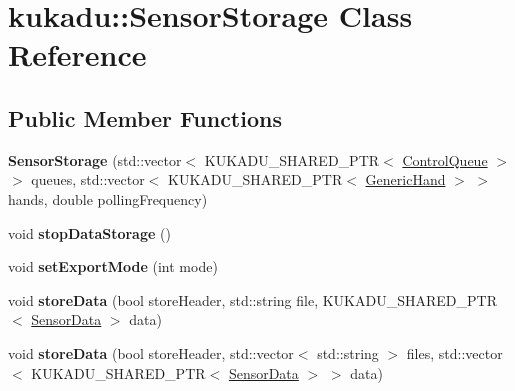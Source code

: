 \hypertarget{classkukadu_1_1SensorStorage}{\section{kukadu\-:\-:Sensor\-Storage Class Reference}
\label{classkukadu_1_1SensorStorage}
}
\subsection*{Public Member Functions}
\begin{DoxyCompactItemize}
\item 
\hypertarget{classkukadu_1_1SensorStorage_a08a91e75da152f2194e573cd9915f609}{{\bfseries Sensor\-Storage} (std\-::vector$<$ K\-U\-K\-A\-D\-U\-\_\-\-S\-H\-A\-R\-E\-D\-\_\-\-P\-T\-R$<$ \hyperlink{classkukadu_1_1ControlQueue}{Control\-Queue} $>$ $>$ queues, std\-::vector$<$ K\-U\-K\-A\-D\-U\-\_\-\-S\-H\-A\-R\-E\-D\-\_\-\-P\-T\-R$<$ \hyperlink{classkukadu_1_1GenericHand}{Generic\-Hand} $>$ $>$ hands, double polling\-Frequency)}\label{classkukadu_1_1SensorStorage_a08a91e75da152f2194e573cd9915f609}

\item 
\hypertarget{classkukadu_1_1SensorStorage_aadec9c676bea6c4f817cd4de8e57ad54}{void {\bfseries stop\-Data\-Storage} ()}\label{classkukadu_1_1SensorStorage_aadec9c676bea6c4f817cd4de8e57ad54}

\item 
\hypertarget{classkukadu_1_1SensorStorage_acbdfa07aa2e4997ad6e5491861fc5821}{void {\bfseries set\-Export\-Mode} (int mode)}\label{classkukadu_1_1SensorStorage_acbdfa07aa2e4997ad6e5491861fc5821}

\item 
\hypertarget{classkukadu_1_1SensorStorage_af139ac656f258cfa38b200e5daa8bef0}{void {\bfseries store\-Data} (bool store\-Header, std\-::string file, K\-U\-K\-A\-D\-U\-\_\-\-S\-H\-A\-R\-E\-D\-\_\-\-P\-T\-R$<$ \hyperlink{classkukadu_1_1SensorData}{Sensor\-Data} $>$ data)}\label{classkukadu_1_1SensorStorage_af139ac656f258cfa38b200e5daa8bef0}

\item 
\hypertarget{classkukadu_1_1SensorStorage_ab9d6af653b8aa0822f80c6278ca2f093}{void {\bfseries store\-Data} (bool store\-Header, std\-::vector$<$ std\-::string $>$ files, std\-::vector$<$ K\-U\-K\-A\-D\-U\-\_\-\-S\-H\-A\-R\-E\-D\-\_\-\-P\-T\-R$<$ \hyperlink{classkukadu_1_1SensorData}{Sensor\-Data} $>$ $>$ data)}\label{classkukadu_1_1SensorStorage_ab9d6af653b8aa0822f80c6278ca2f093}


\end{DoxyCompactItemize}
